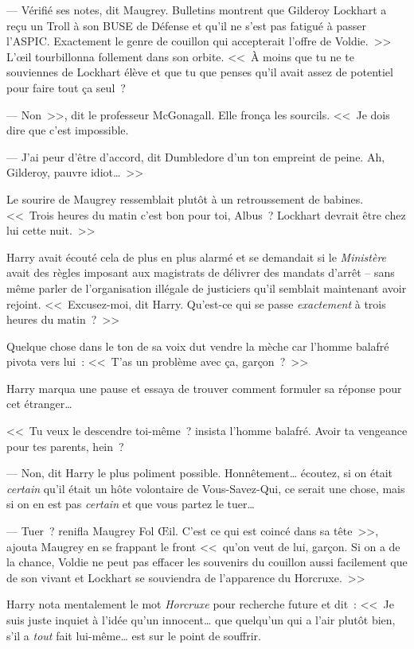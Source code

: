 --- Vérifié ses notes, dit Maugrey. Bulletins montrent que Gilderoy Lockhart a reçu un Troll à son BUSE de Défense et qu'il ne s'est pas fatigué à passer l'ASPIC. Exactement le genre de couillon qui accepterait l'offre de Voldie.~>> L'œil tourbillonna follement dans son orbite. <<~À moins que tu ne te souviennes de Lockhart élève et que tu que penses qu'il avait assez de potentiel pour faire tout ça seul~?

--- Non~>>, dit le professeur McGonagall. Elle fronça les sourcils. <<~Je dois dire que c'est impossible.

--- J'ai peur d'être d'accord, dit Dumbledore d'un ton empreint de peine. Ah, Gilderoy, pauvre idiot…~>>

Le sourire de Maugrey ressemblait plutôt à un retroussement de babines. <<~Trois heures du matin c'est bon pour toi, Albus~? Lockhart devrait être chez lui cette nuit.~>>

Harry avait écouté cela de plus en plus alarmé et se demandait si le \emph{Ministère} avait des règles imposant aux magistrats de délivrer des mandats d'arrêt -- sans même parler de l'organisation illégale de justiciers qu'il semblait maintenant avoir rejoint. <<~Excusez-moi, dit Harry. Qu'est-ce qui se passe \emph{exactement} à trois heures du matin~?~>>

Quelque chose dans le ton de sa voix dut vendre la mèche car l'homme balafré pivota vers lui~: <<~T'as un problème avec ça, garçon~?~>>

Harry marqua une pause et essaya de trouver comment formuler sa réponse pour cet étranger…

<<~Tu veux le descendre toi-même~? insista l'homme balafré. Avoir ta vengeance pour tes parents, hein~?

--- Non, dit Harry le plus poliment possible. Honnêtement… écoutez, si on était \emph{certain} qu'il était un hôte volontaire de Vous-Savez-Qui, ce serait une chose, mais si on en est pas \emph{certain} et que vous partez le tuer…

--- Tuer~? renifla Maugrey Fol Œil. C'est ce qui est coincé dans sa tête~>>, ajouta Maugrey en se frappant le front <<~qu'on veut de lui, garçon. Si on a de la chance, Voldie ne peut pas effacer les souvenirs du couillon aussi facilement que de son vivant et Lockhart se souviendra de l'apparence du Horcruxe.~>>

Harry nota mentalement le mot \emph{Horcruxe} pour recherche future et dit~: <<~Je suis juste inquiet à l'idée qu'un innocent… que quelqu'un qui a l'air plutôt bien, s'il a \emph{tout} fait lui-même… est sur le point de souffrir.

